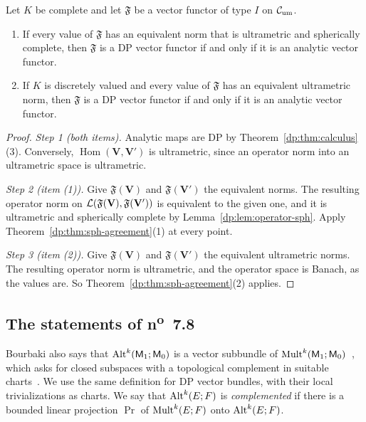 \begin{theorem}\label{dp:thm:functors-um}
Let $K$ be complete and let $\mathfrak F$ be a vector functor of type $I$ on $\mathcal{C}_{\rm um}$.
\begin{enumerate}
\item If every value of $\mathfrak F$ has an equivalent norm that is ultrametric and spherically complete, then $\mathfrak F$ is a DP vector functor if and only if it is an analytic vector functor.
\item If $K$ is discretely valued and every value of $\mathfrak F$ has an equivalent ultrametric norm, then $\mathfrak F$ is a DP vector functor if and only if it is an analytic vector functor.
\end{enumerate}
\end{theorem}

\begin{proof}
\emph{Step 1 (both items).} Analytic maps are DP by Theorem~\ref{dp:thm:calculus}(3). Conversely, $\operatorname{Hom}(\mathbf V,\mathbf V')$ is ultrametric, since an operator norm into an ultrametric space is ultrametric.

\emph{Step 2 (item (1)).} Give $\mathfrak F(\mathbf V)$ and $\mathfrak F(\mathbf V')$ the equivalent norms. The resulting operator norm on $\mathcal L(\mathfrak F(\mathbf V),\mathfrak F(\mathbf V'))$ is equivalent to the given one, and it is ultrametric and spherically complete by Lemma~\ref{dp:lem:operator-sph}. Apply Theorem~\ref{dp:thm:sph-agreement}(1) at every point.

\emph{Step 3 (item (2)).} Give $\mathfrak F(\mathbf V)$ and $\mathfrak F(\mathbf V')$ the equivalent ultrametric norms. The resulting operator norm is ultrametric, and the operator space is Banach, as the values are. So Theorem~\ref{dp:thm:sph-agreement}(2) applies.
\end{proof}

\subsection{The statements of \texorpdfstring{n\textsuperscript{o}~7.8}{no. 7.8}}

Bourbaki also says that $\operatorname{Alt}^k(\mathsf M_1;\mathsf M_0)$ is a vector subbundle of $\operatorname{Mult}^k(\mathsf M_1;\mathsf M_0)$~\cite[n\textsuperscript{o}~7.8.1]{Bou}, which asks for closed subspaces with a topological complement in suitable charts~\cite[n\textsuperscript{o}~7.5.1]{Bou}. We use the same definition for DP vector bundles, with their local trivializations as charts. We say that $\operatorname{Alt}^k(E;F)$ is \emph{complemented} if there is a bounded linear projection $\operatorname{Pr}$ of $\operatorname{Mult}^k(E;F)$ onto $\operatorname{Alt}^k(E;F)$.

